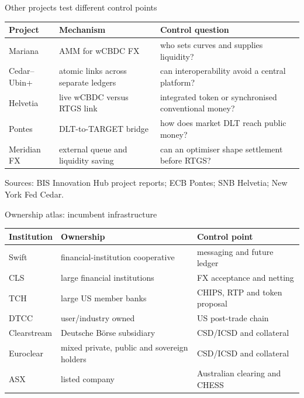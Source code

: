 \documentclass[aspectratio=169,12pt]{beamer}
\newcommand{\source}[1]{\vfill\par\fontsize{5.4}{6.5}\selectfont\color{Quiet}Sources: #1}
\begin{document}
\begin{frame}{Other projects test different control points}
  \fontsize{9.8}{11.8}\selectfont
  \begin{tabularx}{\textwidth}{L{1.95cm}Y Y}
    \toprule
    \textbf{Project} & \textbf{Mechanism} & \textbf{Control question} \\
    \midrule
    Mariana & AMM for wCBDC FX & who sets curves and supplies liquidity? \\
    Cedar--Ubin+ & atomic links across separate ledgers & can interoperability avoid a central platform? \\
    Helvetia & live wCBDC versus RTGS link & integrated token or synchronised conventional money? \\
    Pontes & DLT-to-TARGET bridge & how does market DLT reach public money? \\
    Meridian FX & external queue and liquidity saving & can an optimiser shape settlement before RTGS? \\
    \bottomrule
  \end{tabularx}
  \source{BIS Innovation Hub project reports; ECB Pontes; SNB Helvetia; New York Fed Cedar.}
\end{frame}

\begin{frame}{Ownership atlas: incumbent infrastructure}
  \fontsize{8.8}{10.5}\selectfont
  \begin{tabularx}{\textwidth}{L{1.65cm}Y Y}
    \toprule
    \textbf{Institution} & \textbf{Ownership} & \textbf{Control point} \\
    \midrule
    Swift & financial-institution cooperative & messaging and future ledger \\
    CLS & large financial institutions & FX acceptance and netting \\
    TCH & large US member banks & CHIPS, RTP and token proposal \\
    DTCC & user/industry owned & US post-trade chain \\
    Clearstream & Deutsche B\"orse subsidiary & CSD/ICSD and collateral \\
    Euroclear & mixed private, public and sovereign holders & CSD/ICSD and collateral \\
    ASX & listed company & Australian clearing and CHESS \\
    \bottomrule
  \end{tabularx}
\end{frame}
\end{document}
